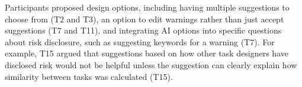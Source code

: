 Participants proposed design options, including having multiple suggestions to choose from (T2 and T3), an option to edit warnings rather than just accept suggestions (T7 and T11), and integrating AI options into specific questions about risk disclosure, such as suggesting keywords for a warning (T7). 
For example, T15 argued that suggestions based on how other task designers have disclosed risk would not be helpful unless the suggestion can clearly explain how similarity between tasks was calculated (T15).

